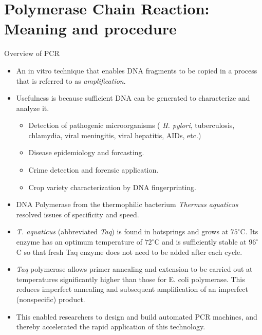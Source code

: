 \documentclass[
  ignorenonframetext,
  aspectratio=169]{beamer}
\providecommand{\tightlist}{%
  \setlength{\itemsep}{0pt}\setlength{\parskip}{0pt}}
\begin{document}
\hypertarget{polymerase-chain-reaction-meaning-and-procedure}{%
\section{Polymerase Chain Reaction: Meaning and
procedure}\label{polymerase-chain-reaction-meaning-and-procedure}}

\begin{frame}{Overview of PCR}
\protect\hypertarget{overview-of-pcr}{}
\footnotesize

\begin{itemize}
\tightlist
\item
  An in vitro technique that enables DNA fragments to be copied in a
  process that is referred to as \emph{amplification}.
\item
  Usefulness is because sufficient DNA can be generated to characterize
  and analyze it.

  \begin{itemize}
  \tightlist
  \item
    Detection of pathogenic microorganisms ( \emph{H. pylori},
    tuberculosis, chlamydia, viral meningitis, viral hepatitis, AIDs,
    etc.)
  \item
    Disease epidemiology and forcasting.
  \item
    Crime detection and forensic application.
  \item
    Crop variety characterization by DNA fingerprinting.
  \end{itemize}
\item
  \alert{DNA Polymerase} from the thermophilic bacterium \emph{Thermus
  aquaticus} resolved issues of specificity and speed.
\item
  \emph{T. aquaticus} (abbreviated \emph{Taq}) is found in hotsprings
  and grows at \(75^\circ\)C. Its enzyme has an optimum temperature of
  \(72^\circ\)C and is sufficiently stable at \(96^\circ\)C so that
  fresh Taq enzyme does not need to be added after each cycle.
\item
  \emph{Taq} polymerase allows primer annealing and extension to be
  carried out at temperatures significantly higher than those for E.
  coli polymerase. This reduces imperfect annealing and subsequent
  amplification of an imperfect (nonspecific) product.
\item
  This enabled researchers to design and build automated PCR machines,
  and thereby accelerated the rapid application of this technology.
\end{itemize}
\end{frame}
\end{document}
